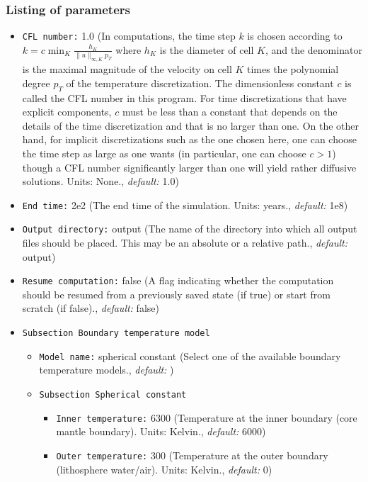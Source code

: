 \subsubsection*{Listing of parameters}

\begin{itemize}
\item {\tt CFL number:} 1.0 (In computations, the time step $k$ is chosen according to $k = c \min_K \frac{h_K}{\|u\|_{\infty,K} p_T}$ where $h_K$ is the diameter of cell $K$, and the denominator is the maximal magnitude of the velocity on cell $K$ times the polynomial degree $p_T$ of the temperature discretization. The dimensionless constant $c$ is called the CFL number in this program. For time discretizations that have explicit components, $c$ must be less than a constant that depends on the details of the time discretization and that is no larger than one. On the other hand, for implicit discretizations such as the one chosen here, one can choose the time step as large as one wants (in particular, one can choose $c>1$) though a CFL number significantly larger than one will yield rather diffusive solutions. Units: None., {\it default:} 1.0)
\item {\tt End time:} 2e2 (The end time of the simulation. Units: years., {\it default:} 1e8)
\item {\tt Output directory:} output (The name of the directory into which all output files should be placed. This may be an absolute or a relative path., {\it default:} output)
\item {\tt Resume computation:} false (A flag indicating whether the computation should be resumed from a previously saved state (if true) or start from scratch (if false)., {\it default:} false)



\item {\tt Subsection Boundary temperature model}
\begin{itemize}
\item {\tt Model name:} spherical constant (Select one of the available boundary temperature models., {\it default:} )



\item {\tt Subsection Spherical constant}
\begin{itemize}
\item {\tt Inner temperature:} 6300 (Temperature at the inner boundary (core mantle boundary). Units: Kelvin., {\it default:} 6000)
\item {\tt Outer temperature:} 300 (Temperature at the outer boundary (lithosphere water/air). Units: Kelvin., {\it default:} 0)
\end{itemize}
\end{itemize}


\end{itemize}

